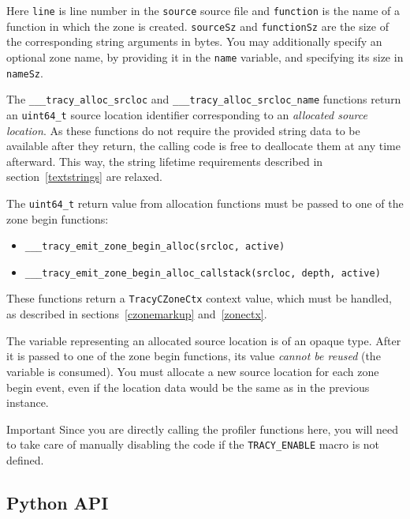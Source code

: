 \documentclass[hidelinks,titlepage,a4paper,twoside]{article}
\begin{document}
Here \texttt{line} is line number in the \texttt{source} source file and \texttt{function} is the
name of a function in which the zone is created. \texttt{sourceSz} and \texttt{functionSz} are the
size of the corresponding string arguments in bytes. You may additionally specify an optional zone
name, by providing it in the \texttt{name} variable, and specifying its size in \texttt{nameSz}.

The \texttt{\_\_\_tracy\_alloc\_srcloc} and \texttt{\_\_\_tracy\_alloc\_srcloc\_name} functions
return an \texttt{uint64\_t} source location identifier corresponding to an \emph{allocated source
location}. As these functions do not require the provided string data to be available after they
return, the calling code is free to deallocate them at any time afterward. This way, the string
lifetime requirements described in section~\ref{textstrings} are relaxed.

The \texttt{uint64\_t} return value from allocation functions must be passed to one of the zone
begin functions:

\begin{itemize}
\item \texttt{\_\_\_tracy\_emit\_zone\_begin\_alloc(srcloc, active)}
\item \texttt{\_\_\_tracy\_emit\_zone\_begin\_alloc\_callstack(srcloc, depth, active)}
\end{itemize}


These functions return a \texttt{TracyCZoneCtx} context value, which must be handled, as described
in sections~\ref{czonemarkup} and~\ref{zonectx}.

The variable representing an allocated source location is of an opaque type. After it is passed to one of the zone begin functions, its value \emph{cannot be reused} (the variable is consumed). You must allocate a new source location for each zone begin event, even if the location data would be the same as in the previous instance.

\begin{bclogo}[
noborder=true,
couleur=black!5,
logo=\bcbombe
]{Important}
Since you are directly calling the profiler functions here, you will need to take care of manually
disabling the code if the \texttt{TRACY\_ENABLE} macro is not defined.
\end{bclogo}

\subsection{Python API}
\label{pythonapi}
\end{document}
